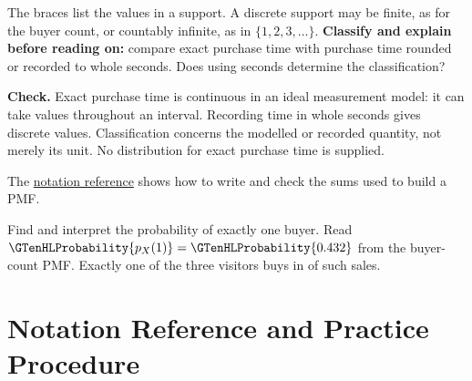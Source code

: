 The braces list the values in a support. A discrete support may be finite, as for the buyer count, or countably infinite, as in $\{1,2,3,\ldots\}$. \textbf{Classify and explain before reading on:} compare exact purchase time with purchase time rounded or recorded to whole seconds. Does using seconds determine the classification?

\par\smallskip\textbf{Check.} Exact purchase time is continuous in an ideal measurement model: it can take values throughout an interval. Recording time in whole seconds gives discrete values. Classification concerns the modelled or recorded quantity, not merely its unit. No distribution for exact purchase time is supplied.

The \hyperref[subsec:t2-c1-notation-reference]{notation reference} shows how to write and check the sums used to build a PMF.

\par\medskip\noindent{} Find and interpret the probability of exactly one buyer. Read $\GTenHLProbability{p_{X}(1)}=\GTenHLProbability{0.432}$ from the buyer-count PMF. Exactly one of the three visitors buys in  of such sales.


\section{Notation Reference and Practice Procedure}\label{sec:t2-c1-notation-and-procedure}


